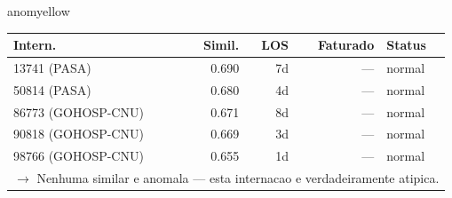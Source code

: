 \documentclass[a4paper,10pt]{article}
\begin{document}
\begin{anomalycard}[Internacao 159777 | PASA | MODERADO (z=2.09)]{anomyellow}
\begin{tabular}{l r r r l}\toprule\textbf{Intern.} & \textbf{Simil.} & \textbf{LOS} & \textbf{Faturado} & \textbf{Status} \\\midrule
13741 (PASA) & 0.690 & 7d & --- & \textcolor{jcubeblue}{normal} \\
50814 (PASA) & 0.680 & 4d & --- & \textcolor{jcubeblue}{normal} \\
86773 (GOHOSP-CNU) & 0.671 & 8d & --- & \textcolor{jcubeblue}{normal} \\
90818 (GOHOSP-CNU) & 0.669 & 3d & --- & \textcolor{jcubeblue}{normal} \\
98766 (GOHOSP-CNU) & 0.655 & 1d & --- & \textcolor{jcubeblue}{normal} \\
\multicolumn{5}{l}{\textcolor{jcubeblue}{\small $\rightarrow$ Nenhuma similar e anomala --- esta internacao e verdadeiramente atipica.}} \\
\bottomrule\end{tabular}



\end{anomalycard}

\newpage
\end{document}
